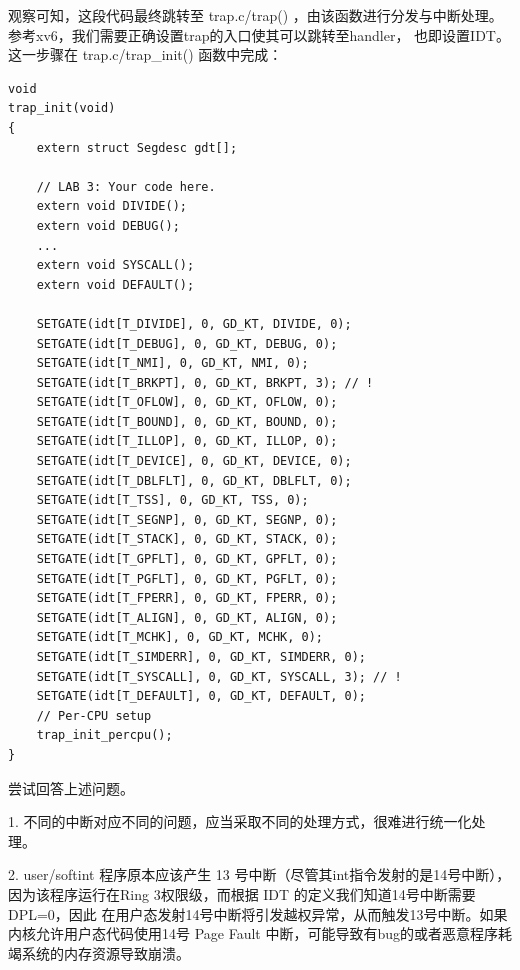 \documentclass[12pt, letterpaper]{report}
\begin{document}
\newpage
观察可知，这段代码最终跳转至 trap.c/trap() ，由该函数进行分发与中断处理。
参考xv6，我们需要正确设置trap的入口使其可以跳转至handler，
也即设置IDT。这一步骤在 trap.c/trap\_init() 函数中完成：
\lstset{style=CStyle}
\setmainfont{Consolas}
\begin{lstlisting}
void
trap_init(void)
{
    extern struct Segdesc gdt[];

    // LAB 3: Your code here.
    extern void DIVIDE();
    extern void DEBUG();
    ...
    extern void SYSCALL();
    extern void DEFAULT();

    SETGATE(idt[T_DIVIDE], 0, GD_KT, DIVIDE, 0);
    SETGATE(idt[T_DEBUG], 0, GD_KT, DEBUG, 0);
    SETGATE(idt[T_NMI], 0, GD_KT, NMI, 0);
    SETGATE(idt[T_BRKPT], 0, GD_KT, BRKPT, 3); // !
    SETGATE(idt[T_OFLOW], 0, GD_KT, OFLOW, 0);
    SETGATE(idt[T_BOUND], 0, GD_KT, BOUND, 0);
    SETGATE(idt[T_ILLOP], 0, GD_KT, ILLOP, 0);
    SETGATE(idt[T_DEVICE], 0, GD_KT, DEVICE, 0);
    SETGATE(idt[T_DBLFLT], 0, GD_KT, DBLFLT, 0);
    SETGATE(idt[T_TSS], 0, GD_KT, TSS, 0);
    SETGATE(idt[T_SEGNP], 0, GD_KT, SEGNP, 0);
    SETGATE(idt[T_STACK], 0, GD_KT, STACK, 0);
    SETGATE(idt[T_GPFLT], 0, GD_KT, GPFLT, 0);
    SETGATE(idt[T_PGFLT], 0, GD_KT, PGFLT, 0);
    SETGATE(idt[T_FPERR], 0, GD_KT, FPERR, 0);
    SETGATE(idt[T_ALIGN], 0, GD_KT, ALIGN, 0);
    SETGATE(idt[T_MCHK], 0, GD_KT, MCHK, 0);
    SETGATE(idt[T_SIMDERR], 0, GD_KT, SIMDERR, 0);
    SETGATE(idt[T_SYSCALL], 0, GD_KT, SYSCALL, 3); // !
    SETGATE(idt[T_DEFAULT], 0, GD_KT, DEFAULT, 0);
    // Per-CPU setup 
    trap_init_percpu();
}
\end{lstlisting}
\setmainfont{Times New Roman}

\newpage 
{}
\quad \par 
尝试回答上述问题。\par 
1. 不同的中断对应不同的问题，应当采取不同的处理方式，很难进行统一化处理。\par 
2. user/softint 程序原本应该产生 13 号中断（尽管其int指令发射的是14号中断），
因为该程序运行在Ring 3权限级，而根据 IDT 的定义我们知道14号中断需要DPL=0，因此
在用户态发射14号中断将引发越权异常，从而触发13号中断。如果内核允许用户态代码使用14号
Page Fault 中断，可能导致有bug的或者恶意程序耗竭系统的内存资源导致崩溃。\par 
\end{document}
